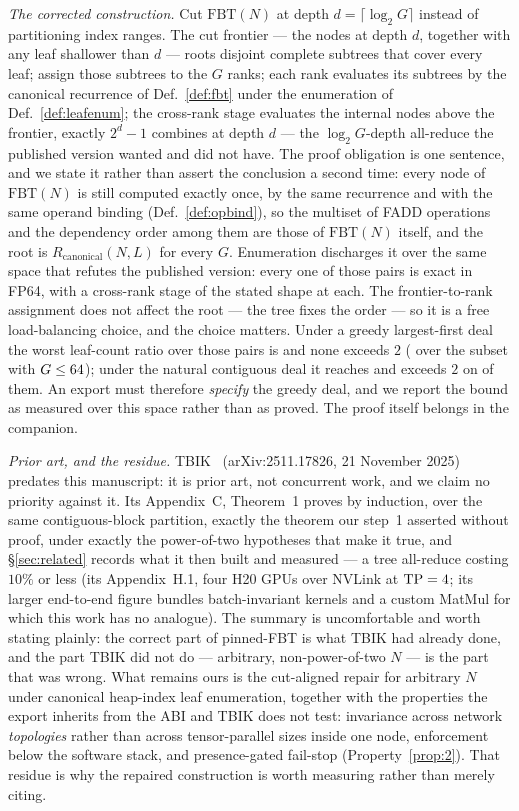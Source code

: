 \documentclass[journal,10pt]{IEEEtran}
\theoremstyle{plain}
\theoremstyle{definition}
\theoremstyle{remark}
\newcommand{\FBT}{\ensuremath{\mathrm{FBT}}}
\newcommand{\Rcan}{\ensuremath{R_{\mathrm{canonical}}}}
\begin{document}
\emph{The corrected construction.} Cut $\FBT(N)$ at depth
$d = \lceil \log_2 G \rceil$ instead of partitioning index ranges. The cut
frontier --- the nodes at depth $d$, together with any leaf shallower than
$d$ --- roots disjoint complete subtrees that cover every leaf; assign those
subtrees to the $G$ ranks; each rank evaluates its subtrees by the canonical
recurrence of Def.~\ref{def:fbt} under the enumeration of
Def.~\ref{def:leafenum}; the cross-rank stage evaluates the internal nodes
above the frontier, exactly $2^{d}-1$ combines at depth $d$ --- the
$\log_2 G$-depth all-reduce the published version wanted and did not have.
The proof obligation is one sentence, and we state it rather than assert the
conclusion a second time: every node of $\FBT(N)$ is still computed exactly
once, by the same recurrence and with the same operand binding
(Def.~\ref{def:opbind}), so the multiset of FADD operations and the
dependency order among them are those of $\FBT(N)$ itself, and the root is
$\Rcan(N,L)$ for every $G$. Enumeration discharges it over the same space
that refutes the published version: every one of those \SweepPairs{} pairs is
exact in FP64, with a cross-rank stage of the stated shape at each. The frontier-to-rank assignment does not affect the root --- the tree
fixes the order --- so it is a free load-balancing choice, and the choice
matters. Under a greedy largest-first deal the worst leaf-count ratio over
those pairs is \PinImbLpt{} and none exceeds $2$ (\RepairImbalance{} over the
subset with $G \le 64{}$); under the natural
contiguous deal it reaches \PinImbContig{} and exceeds $2$ on
\PinImbContigOver{} of them. An export must therefore \emph{specify} the
greedy deal, and we report the bound as measured over this space rather than
as proved. The proof itself belongs in the companion.

\emph{Prior art, and the residue.} TBIK~\cite{tbik2025} (arXiv:2511.17826,
21 November 2025) predates this manuscript: it is prior art, not concurrent
work, and we claim no priority against it. Its Appendix~C, Theorem~1 proves
by induction, over the same contiguous-block partition, exactly the theorem
our step~1 asserted without proof, under exactly the power-of-two hypotheses
that make it true, and \S\ref{sec:related} records what it then built and
measured --- a tree all-reduce costing $10\%$ or less (its Appendix~H.1, four
H20 GPUs over NVLink at ${\rm TP}=4$; its larger end-to-end figure bundles
batch-invariant kernels and a custom MatMul for which this work has no
analogue). The summary is uncomfortable and worth stating plainly: the
correct part of pinned-FBT is
what TBIK had already done, and the part TBIK did not do --- arbitrary,
non-power-of-two $N$ --- is the part that was wrong. What remains ours is
the cut-aligned repair for arbitrary $N$ under canonical heap-index leaf
enumeration, together with the properties the export inherits from the ABI
and TBIK does not test: invariance across network \emph{topologies} rather
than across tensor-parallel sizes inside one node, enforcement below the
software stack, and presence-gated fail-stop (Property~\ref{prop:2}). That
residue is why the repaired construction is worth measuring rather than
merely citing.
\end{document}
